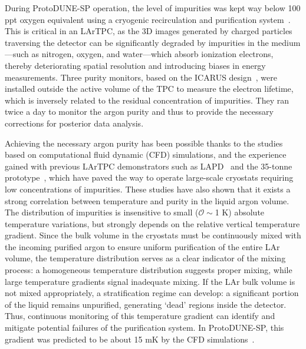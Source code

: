 
During ProtoDUNE-SP operation, the level of impurities was kept way below 100 ppt oxygen equivalent using a cryogenic recirculation and purification system~\cite{pdsp_tdr,pdsp_2}. This is critical in an LArTPC, as the 3D images generated by charged particles traversing the detector can be significantly degraded by impurities in the medium—such as nitrogen, oxygen, and water—which absorb ionization electrons, thereby deteriorating spatial resolution and introducing biases in energy measurements. Three purity monitors, based on the ICARUS design~\cite{PrMs}, were installed outside the active volume of the TPC to measure the electron lifetime, which is inversely related to the residual concentration of impurities. They ran twice a day to monitor the argon purity and thus to provide the necessary corrections for posterior data analysis.

Achieving the necessary argon purity has been possible thanks to the studies based on computational fluid dynamic (CFD) simulations, and the experience gained with previous LArTPC demonstrators such as LAPD~\cite{lapd} and the 35-tonne prototype~\cite{35t_1,35t_2}, which have paved the way to operate large-scale cryostats requiring low concentrations of impurities. These studies have also shown that it exists a strong correlation between temperature and purity in the liquid argon volume. The distribution of impurities is insensitive to small ($\mathcal{O}\sim$1 K) absolute temperature variations, but strongly depends on the relative vertical temperature gradient. Since the bulk volume in the cryostats must be continuously mixed with the incoming purified argon to ensure uniform purification of the entire LAr volume, the temperature distribution serves as a clear indicator of the mixing process: a homogeneous temperature distribution suggests proper mixing, while large temperature gradients signal inadequate mixing. If the LAr bulk volume is not mixed appropriately, a stratification regime can develop: a significant portion of the liquid remains unpurified, generating `dead' regions inside the detector. Thus, continuous monitoring of this temperature gradient can identify and mitigate potential failures of the purification system. In ProtoDUNE-SP, this gradient was predicted to be about 15 mK by the CFD simulations~\cite{pdsp_tdr,dune_tdr4}.

